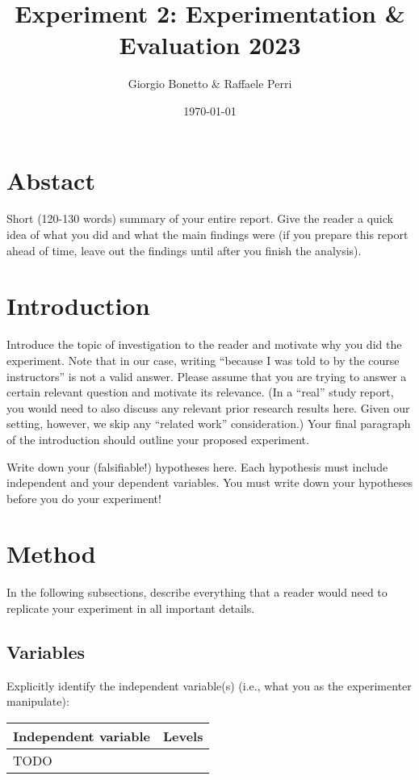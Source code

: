 \documentclass{article}
\title{Experiment 2: Experimentation \& Evaluation 2023}
\author{Giorgio Bonetto \& Raffaele Perri}
\date{\today}
\begin{document}
\maketitle
\section*{Abstact}
Short (120-130 words) summary of your entire report. Give the reader a quick idea of what you did and what the main findings were (if you prepare this report ahead of time, leave out the findings until after you finish the analysis).


\section{Introduction}
Introduce the topic of investigation to the reader and motivate why you did the experiment. Note that in our case, writing “because I was told to by the course instructors” is not a valid answer. Please assume that you are trying to answer a certain relevant question and motivate its relevance. (In a “real” study report, you would need to also discuss any relevant prior research results here. Given our setting, however, we skip any “related work” consideration.) Your final paragraph of the introduction should outline your proposed experiment.



\begin{tcolorbox}[title=Hypotheses:, colback=white, colframe=black, arc=0pt, outer arc=0pt]
    Write down your (falsifiable!) hypotheses here. Each hypothesis must include independent and your dependent variables. You must write down your hypotheses before you do your experiment!


\end{tcolorbox}



\section{Method}
In the following subsections, describe everything that a reader would need to replicate your experiment in all important details.
\subsection{Variables}
Explicitly identify the independent variable(s) (i.e., what you as the experimenter manipulate):

\begin{table}[h!]
\centering
\begin{tabular}{|l|l|}
\hline
\rowcolor{black}
\color{white}Independent variable & \color{white}Levels \\
\hline
TODO &  \\
\hline
\end{tabular}
\end{table}
\end{document}
